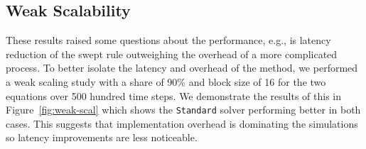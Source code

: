 \documentclass[mca,article,submit,moreauthors,pdftex]{Definitions/mdpi}
\def\Standard{\texttt{Standard}}
\begin{document}
\begin{paracol}{2}
\linenumbers
\switchcolumn

\subsection{Weak Scalability}

These results raised some questions about the performance, e.g., is latency reduction of the swept rule outweighing the overhead of a more complicated process. To better isolate the latency and overhead of the method, we performed a weak scaling study with a share of 90\% and block size of 16 for the two equations over 500 hundred time steps. We demonstrate the results of this in Figure~\ref{fig:weak-scal} which shows the \Standard{} solver performing better in both cases. This suggests that implementation overhead is dominating the simulations so latency improvements are less noticeable. 

\end{paracol}
\nointerlineskip
\end{document}

